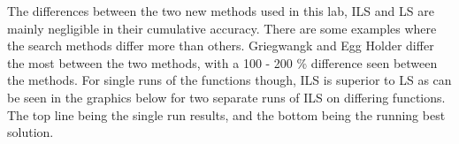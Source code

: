 \documentclass[paper=a4, fontsize=11pt]{scrartcl}
\numberwithin{equation}{section}
\numberwithin{figure}{section}
\numberwithin{table}{section}
\begin{document}
The differences between the two new methods used in this lab, ILS and LS
are mainly negligible in their cumulative accuracy. There are
some examples where the search methods differ more than others. Griegwangk
and Egg Holder differ the most between the two methods, with a 100 - 200 \%
difference seen between the methods. For single runs of the functions though,
ILS is superior to LS as can be seen in the graphics below for two separate
runs of ILS on differing functions. The top line being the single run results,
and the bottom being the running best solution.


\end{document}
